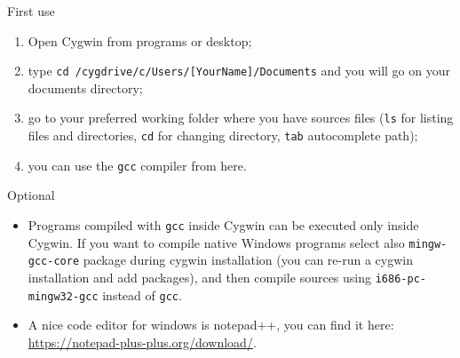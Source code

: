 \begin{frame}
  \begin{block}{First use}
    \begin{enumerate}
    \item Open Cygwin from programs or desktop;
    \item type \alert{\texttt{cd
          /cygdrive/c/Users/[YourName]/Documents}} and you will go on
      your documents directory;
    \item go to your preferred working folder where you have sources
      files (\alert{\texttt{ls}} for listing files and directories,
      \alert{\texttt{cd}} for changing directory, \alert{\texttt{tab}}
      autocomplete path);
    \item you can use the \alert{\texttt{gcc}} compiler from here.
    \end{enumerate}
  \end{block}
  \begin{block}{Optional}
    \begin{itemize}
    \item Programs compiled with \alert{\texttt{gcc}} inside Cygwin
      can be executed only inside Cygwin.
      If you want to compile native Windows programs select also
      \alert{\texttt{mingw-gcc-core}} package during cygwin installation
      (you can re-run a cygwin installation and add packages), and then
      compile sources using \alert{\texttt{i686-pc-mingw32-gcc}} instead
      of \alert{\texttt{gcc}}.
    \item A nice code editor for windows is \alert{notepad++}, you can
      find it here: \url{https://notepad-plus-plus.org/download/}.
    \end{itemize}
  \end{block}  
\end{frame}

